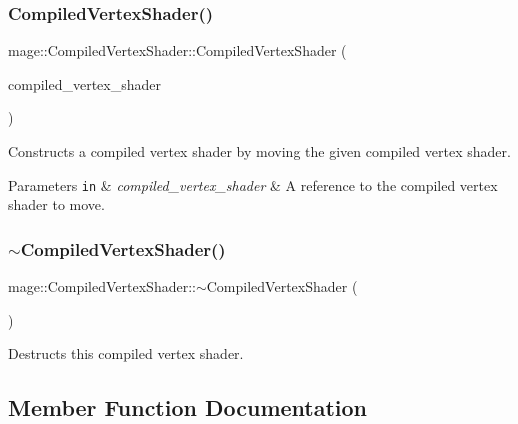 \subsubsection{\texorpdfstring{Compiled\+Vertex\+Shader()}{CompiledVertexShader()}\hspace{0.1cm}{\footnotesize\ttfamily [3/3]}}
{\footnotesize\ttfamily mage\+::\+Compiled\+Vertex\+Shader\+::\+Compiled\+Vertex\+Shader (\begin{DoxyParamCaption}\item[{\hyperlink{structmage_1_1_compiled_vertex_shader}{Compiled\+Vertex\+Shader} \&\&}]{compiled\+\_\+vertex\+\_\+shader }\end{DoxyParamCaption})\hspace{0.3cm}{\ttfamily [default]}}

Constructs a compiled vertex shader by moving the given compiled vertex shader.


\begin{DoxyParams}[1]{Parameters}
\mbox{\tt in}  & {\em compiled\+\_\+vertex\+\_\+shader} & A reference to the compiled vertex shader to move. \\
\hline
\end{DoxyParams}
\hypertarget{structmage_1_1_compiled_vertex_shader_af909e9e38ec2eef93a77aeac993e4755}{}\label{structmage_1_1_compiled_vertex_shader_af909e9e38ec2eef93a77aeac993e4755} 
\subsubsection{\texorpdfstring{$\sim$\+Compiled\+Vertex\+Shader()}{~CompiledVertexShader()}}
{\footnotesize\ttfamily mage\+::\+Compiled\+Vertex\+Shader\+::$\sim$\+Compiled\+Vertex\+Shader (\begin{DoxyParamCaption}{ }\end{DoxyParamCaption})\hspace{0.3cm}{\ttfamily [default]}}

Destructs this compiled vertex shader. 

\subsection{Member Function Documentation}
\hypertarget{structmage_1_1_compiled_vertex_shader_a9ce8c846d9c29ffd67a19cffd362b709}{}\label{structmage_1_1_compiled_vertex_shader_a9ce8c846d9c29ffd67a19cffd362b709} 
